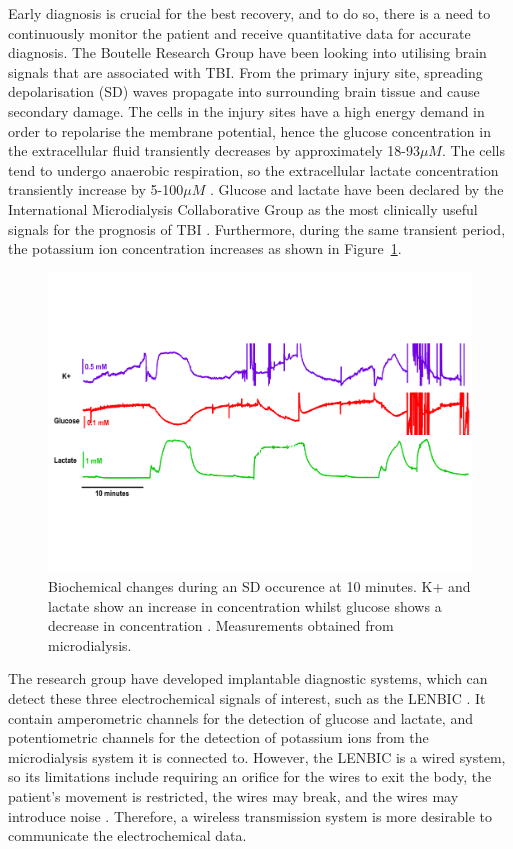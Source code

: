 Early diagnosis is crucial for the best recovery, and to do so, there is a need to continuously monitor the patient and receive quantitative data for accurate diagnosis. The Boutelle Research Group have been looking into utilising brain signals that are associated with TBI. From the primary injury site, spreading depolarisation (SD) waves propagate into surrounding brain tissue and cause secondary damage. The cells in the injury sites have a high energy demand in order to repolarise the membrane potential, hence the glucose concentration in the extracellular fluid transiently decreases by approximately 18-93$\mu M$. The cells tend to undergo anaerobic respiration, so the extracellular lactate concentration transiently increase by 5-100$\mu M$ \cite{D.2010}. Glucose and lactate have been declared by the International Microdialysis Collaborative Group as the most clinically useful signals for the prognosis of TBI \cite{Hutchinson2015}. Furthermore, during the same transient period, the potassium ion concentration increases \cite{Rogers2017} as shown in Figure~\ref{fig: SD}.

\begin{figure}[t]
\centering
\includegraphics[trim={0cm 5cm 0.5cm  5cm}, clip, width=1\textwidth]{./figures/conc.pdf}
\captionsetup{justification=centering}
\caption{Biochemical changes during an SD occurence at 10 minutes. K+ and lactate show an increase in concentration whilst glucose shows a decrease in concentration \cite{Rogers2017}. Measurements obtained from microdialysis.}
\label{fig: SD}
\end{figure}

The research group have developed implantable diagnostic systems, which can detect these three electrochemical signals of interest, such as the LENBIC \cite{Pagkalos2017}. It contain amperometric channels for the detection of glucose and lactate, and potentiometric channels for the detection of potassium ions from the microdialysis system it is connected to. However, the LENBIC is a wired system, so its limitations include requiring an orifice for the wires to exit the body, the patient's movement is restricted, the wires may break, and the wires may introduce noise \cite{Ferguson2011}. Therefore, a wireless transmission system is more desirable to communicate the electrochemical data. 

